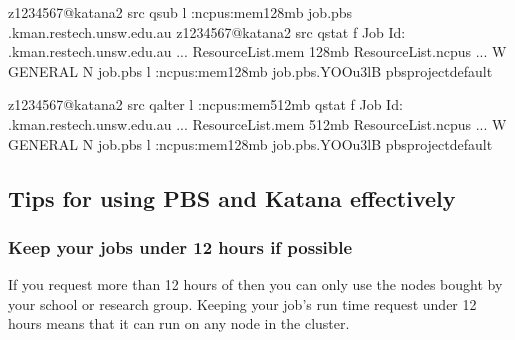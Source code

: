 \documentclass[letterpaper,10pt,english]{sphinxmanual}
\begin{document}
\begin{sphinxVerbatim}[commandchars=\\\{\}]
\PYG{o}{[}z1234567@katana2 src\PYG{o}{]}\PYGZdl{} qsub \PYGZhy{}l :ncpus:mem128mb job.pbs
.kman.restech.unsw.edu.au
\PYG{o}{[}z1234567@katana2 src\PYG{o}{]}\PYGZdl{} qstat \PYGZhy{}f 
Job Id: .kman.restech.unsw.edu.au
    ...
    Resource\PYGZus{}List.mem  128mb
    Resource\PYGZus{}List.ncpus  
    ...
      \PYGZhy{}W GENERAL \PYGZhy{}N job.pbs \PYGZhy{}l :ncpus:mem128mb job.pbs.YOOu3lB
      \PYGZus{}pbs\PYGZus{}project\PYGZus{}default

\PYG{o}{[}z1234567@katana2 src\PYG{o}{]}\PYGZdl{} qalter \PYGZhy{}l :ncpus:mem512mb  qstat \PYGZhy{}f 
Job Id: .kman.restech.unsw.edu.au
    ...
    Resource\PYGZus{}List.mem  512mb
    Resource\PYGZus{}List.ncpus  
    ...
      \PYGZhy{}W GENERAL \PYGZhy{}N job.pbs \PYGZhy{}l :ncpus:mem128mb job.pbs.YOOu3lB
      \PYGZus{}pbs\PYGZus{}project\PYGZus{}default
\end{sphinxVerbatim}


\subsection{Tips for using PBS and Katana effectively}
\label{\detokenize{using_katana/running_jobs:tips-for-using-pbs-and-katana-effectively}}\label{\detokenize{using_katana/running_jobs:scheduler-tips}}

\subsubsection{Keep your jobs under 12 hours if possible}
\label{\detokenize{using_katana/running_jobs:keep-your-jobs-under-12-hours-if-possible}}
If you request more than 12 hours of  then you can only use the nodes bought by your school or research group. Keeping your job’s run time request under 12 hours means that it can run on any node in the cluster.
\end{document}
